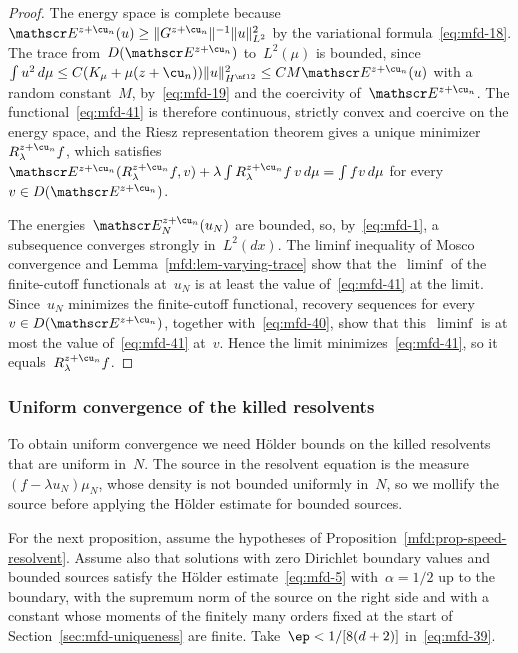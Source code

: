 \documentclass[11pt]{amsart}
\begin{document}
\begin{proof}
The energy space is complete because~$\mathscr E^{z+\cu_n}(u)\geq\|G^{z+\cu_n}\|^{-1}\|u\|_{L^2}^2$ by the variational formula~\eqref{eq:mfd-18}. The trace from~$D(\mathscr E^{z+\cu_n})$ to~$L^2(\mu)$ is bounded, since~$\int u^2\,d\mu\leq C(K_\mu+\mu(z+\cu_n))\|u\|_{H^{\nf12}}^2\leq CM\mathscr E^{z+\cu_n}(u)$ with a random constant~$M$, by~\eqref{eq:mfd-19} and the coercivity of~$\mathscr E^{z+\cu_n}$. The functional~\eqref{eq:mfd-41} is therefore continuous, strictly convex and coercive on the energy space, and the Riesz representation theorem gives a unique minimizer~$R^{z+\cu_n}_\lambda f$, which satisfies~$\mathscr E^{z+\cu_n}(R^{z+\cu_n}_\lambda f,v)+\lambda\int R^{z+\cu_n}_\lambda f\,v\,d\mu=\int fv\,d\mu$ for every~$v\in D(\mathscr E^{z+\cu_n})$.

\smallskip

The energies~$\mathscr E_N^{z+\cu_n}(u_N)$ are bounded, so, by~\eqref{eq:mfd-1}, a subsequence converges strongly in~$L^2(dx)$. The liminf inequality of Mosco convergence and Lemma~\ref{mfd:lem-varying-trace} show that the~$\liminf$ of the finite-cutoff functionals at~$u_N$ is at least the value of~\eqref{eq:mfd-41} at the limit. Since~$u_N$ minimizes the finite-cutoff functional, recovery sequences for every~$v\in D(\mathscr E^{z+\cu_n})$, together with~\eqref{eq:mfd-40}, show that this~$\liminf$ is at most the value of~\eqref{eq:mfd-41} at~$v$. Hence the limit minimizes~\eqref{eq:mfd-41}, so it equals~$R^{z+\cu_n}_\lambda f$.
\end{proof}

\subsubsection{Uniform convergence of the killed resolvents}

To obtain uniform convergence we need H\"older bounds on the killed resolvents that are uniform in~$N$. The source in the resolvent equation is the measure~$(f-\lambda u_N)\mu_N$, whose density is not bounded uniformly in~$N$, so we mollify the source before applying the H\"older estimate for bounded sources.

For the next proposition, assume the hypotheses of Proposition~\ref{mfd:prop-speed-resolvent}. Assume also that solutions with zero Dirichlet boundary values and bounded sources satisfy the H\"older estimate~\eqref{eq:mfd-5} with~$\alpha=1/2$ up to the boundary, with the supremum norm of the source on the right side and with a constant whose moments of the finitely many orders fixed at the start of Section~\ref{sec:mfd-uniqueness} are finite. Take~$\ep<1/[8(d+2)]$ in~\eqref{eq:mfd-39}.
\end{document}
